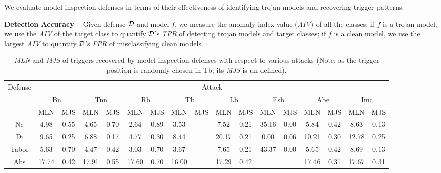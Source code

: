 \documentclass[compsoc,conference,a4paper,10pt,times]{IEEEtran}
\newcommand{\bn}{{\sc Bn}\xspace}
\newcommand{\tnn}{{\sc Tnn}\xspace}
\newcommand{\tb}{{\sc Tb}\xspace}
\newcommand{\lb}{{\sc Lb}\xspace}
\newcommand{\esb}{{\sc Esb}\xspace}
\newcommand{\rfb}{{\sc Rb}\xspace}
\newcommand{\abe}{{\sc Abe}\xspace}
\newcommand{\imc}{{\sc Imc}\xspace}
\newcommand{\tpr}{{\em \small TPR}\xspace}
\newcommand{\fpr}{{\em \small FPR}\xspace}
\newcommand{\mln}{{\em \small MLN}\xspace}
\newcommand{\mjs}{{\em \small MJS}\xspace}
\newcommand{\anidx}{{\em \small AIV}\xspace}
\newcommand{\nc}{{\sc Nc}\xspace}
\newcommand{\abs}{{\sc Abs}\xspace}
\newcommand{\tabor}{{\sc Tabor}\xspace}
\newcommand{\di}{{\sc Di}\xspace}
\begin{document}
We evaluate model-inspection defenses in terms of their effectiveness of  identifying trojan models and  recovering trigger patterns. 

\vspace{2pt}
{\bf Detection Accuracy --} Given defense ${\mathcal{D}}$ and model $f$, we measure the anomaly index value (\anidx) of all the classes; if $f$ is a trojan model, we use the \anidx of the target class to quantify ${\mathcal{D}}$'s \tpr of detecting trojan models and target classes; if $f$ is a clean model, we use the largest \anidx to quantify ${\mathcal{D}}$'s \fpr of misclassifying clean models.



\begin{table}[!ht]{\footnotesize
    \centering
    \renewcommand{\arraystretch}{1.2}
  \setlength{\tabcolsep}{3pt}
    \begin{tabular}{c|c c|c c|c c|c c|c c|c c|c c|c c}
        \multirow{3}{*}{Defense} & \multicolumn{16}{c}{Attack} \\
        \cline{2-17}
       & \multicolumn{2}{c|}{\bn}    & \multicolumn{2}{c|}{\tnn}     & \multicolumn{2}{c|}{\rfb}   & \multicolumn{2}{c|}{\tb}  & \multicolumn{2}{c|}{\lb}  & \multicolumn{2}{c|}{\esb}       & \multicolumn{2}{c|}{\abe}         & \multicolumn{2}{c}{\imc}   \\
       \cline{2-17}
       & MLN & MJS & MLN & MJS & MLN & MJS & MLN & MJS & MLN & MJS & MLN & MJS & MLN & MJS & MLN & MJS  \\
        \hline
        \hline
        \nc  &  \cellcolor{Blue}4.98  & 0.55   &   \cellcolor{Blue}4.65 & \cellcolor{Red}0.70      &  \cellcolor{Blue}2.64 & \cellcolor{Red}0.89   &  \cellcolor{Blue}3.53 & \cellcolor{Gray}    &  \cellcolor{Blue}7.52 & 0.21  & 35.16 & 0.00  & 5.84 & \cellcolor{Red}0.42         &  \cellcolor{Blue}8.63 & 0.13 \\
        \di  &  9.65 & 0.25   & 6.88 & 0.17     & 4.77 & 0.30  & 8.44 & \cellcolor{Gray}  & 20.17 & 0.21 &  \cellcolor{Blue}0.00 & \cellcolor{Red}0.06  & 10.21 & 0.30         & 12.78 & 0.25   \\
        \tabor & 5.63 & \cellcolor{Red}0.70   & 4.47 & 0.42     & 3.03 & 0.70  & 3.67 & \cellcolor{Gray}  & 7.65 & 0.21 & 43.37 & 0.00  &  \cellcolor{Blue}5.65 & \cellcolor{Red}0.42         & 8.69 & 0.13    \\
        \abs   &  17.74 & 0.42   &  17.91 & 0.55     &  17.60 & 0.70  &  16.00 & \cellcolor{Gray} &  17.29 & \cellcolor{Red}0.42 & \cellcolor{Gray}  &\cellcolor{Gray}   &  17.46 & 0.31  &  17.67 & \cellcolor{Red}0.31   \\
    \end{tabular}
    \caption{\mln and \mjs of triggers recovered by model-inspection defenses with respect to various attacks (Note: as the trigger position is randomly chosen in \tb, its \mjs is un-defined). \label{tab:trigger-recover} }}
\end{table}
\end{document}
